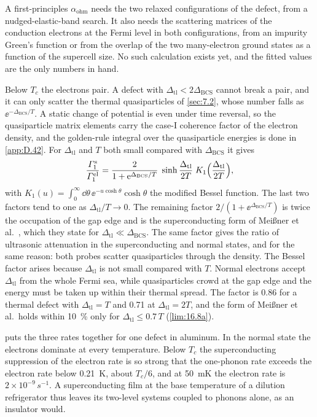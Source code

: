A first-principles $\alpha_{\mathrm{ohm}}$ needs the two relaxed configurations of the defect, from a nudged-elastic-band search. It also needs the scattering matrices of the conduction electrons at the Fermi level in both configurations, from an impurity Green's function or from the overlap of the two many-electron ground states as a function of the supercell size. No such calculation exists yet, and the fitted values are the only numbers in hand.

Below $T_c$ the electrons pair. A defect with $\Delta_{\mathrm{tl}} < 2\Delta_{\mathrm{BCS}}$ cannot break a pair, and it can only scatter the thermal quasiparticles of \cref{sec:7.2}, whose number falls as $\ee^{-\Delta_{\mathrm{BCS}}/T}$. A static change of potential is even under time reversal, so the quasiparticle matrix elements carry the case-I coherence factor of the electron density, and the golden-rule integral over the quasiparticle energies is done in \cref{app:D.42}. For $\Delta_{\mathrm{tl}}$ and $T$ both small compared with $\Delta_{\mathrm{BCS}}$ it gives
\begin{equation}
  \frac{\varGamma_1^{\mathrm{s}}}{\varGamma_1^{\mathrm{el}}} = \frac{2}{1 + \mathrm{e}^{\Delta_{\mathrm{BCS}}/T}}\;\sinh\frac{\Delta_{\mathrm{tl}}}{2T}\;K_1\Bigl(\frac{\Delta_{\mathrm{tl}}}{2T}\Bigr) ,
  \label{eq:16.8-sc}
\end{equation}
with $K_1(u) = \int_0^\infty\dd\theta\,\ee^{-u\cosh\theta}\cosh\theta$ the modified Bessel function. The last two factors tend to one as $\Delta_{\mathrm{tl}}/T \to 0$. The remaining factor $2/(1 + \ee^{\Delta_{\mathrm{BCS}}/T})$ is twice the occupation of the gap edge and is the superconducting form of Meißner et al.~\cite[Eq.~(9)]{meissner2021acoustic}, which they state for $\Delta_{\mathrm{tl}} \ll \Delta_{\mathrm{BCS}}$. The same factor gives the ratio of ultrasonic attenuation in the superconducting and normal states, and for the same reason: both probes scatter quasiparticles through the density. The Bessel factor arises because $\Delta_{\mathrm{tl}}$ is not small compared with $T$. Normal electrons accept $\Delta_{\mathrm{tl}}$ from the whole Fermi sea, while quasiparticles crowd at the gap edge and the energy must be taken up within their thermal spread. The factor is 0.86 for a thermal defect with $\Delta_{\mathrm{tl}} = T$ and 0.71 at $\Delta_{\mathrm{tl}} = 2T$, and the form of Meißner et al.\ holds within \SI{10}{\percent} only for $\Delta_{\mathrm{tl}} \le 0.7\,T$ (\cref{lim:16.8a}).

 puts the three rates together for one defect in aluminum. In the normal state the electrons dominate at every temperature. Below $T_c$ the superconducting suppression of the electron rate is so strong that the one-phonon rate exceeds the electron rate below \SI{0.21}{K}, about $T_c/6$, and at \SI{50}{mK} the electron rate is $2\times10^{-9}\,\si{s^{-1}}$. A superconducting film at the base temperature of a dilution refrigerator thus leaves its two-level systems coupled to phonons alone, as an insulator would.

